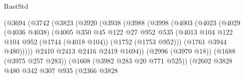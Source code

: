 \begin{lexlean}{RustStd}
\begin{coremodule}
                                      (@3694
                                        (@3742
                                          (@3823
                                            (@3920
                                              (@3938
                                                (@3988
                                                  (@3998
                                                    (@4003
                                                      (@4023
                                                        (@4029
                                                          (@4036 @4038)
                                                          (@4005
                                                            @350
                                                            @45
                                                            @122
                                                            @27
                                                            @952
                                                            @535
                                                            (@4013
                                                              @104
                                                              @122
                                                              @104
                                                              @952
                                                              (@1744 (@4018 @104))
                                                              (@1752 (@1753 @952)))
                                                            (@1761 @3944 @480)))))
                                                    @2410
                                                    @2413
                                                    @2416
                                                    @2419
                                                    @1694))
                                                (@2996 (@3970 @18))
                                                (@1688 (@3975 @257 @283))
                                                (@1608 (@3982 @283 @20 @771 @525))
                                                (@2602
                                                  @3828
                                                  @480
                                                  @342
                                                  @307
                                                  @935
                                                  (@2366
                                                    @3828

\end{coremodule}
\end{lexlean}
